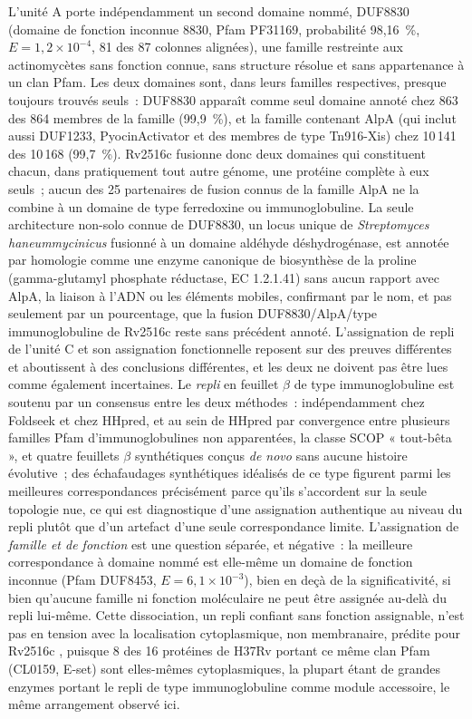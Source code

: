 \documentclass[11pt,a4paper]{article}
\begin{document}
L'unité A porte indépendamment un second domaine nommé, DUF8830 (domaine de fonction inconnue
8830, Pfam PF31169, probabilité 98,16~\%, $E=1,2\times10^{-4}$, 81 des 87 colonnes alignées), une
famille restreinte aux actinomycètes sans fonction connue, sans structure résolue et sans
appartenance à un clan Pfam. Les deux domaines sont, dans leurs familles respectives, presque
toujours trouvés seuls~: DUF8830 apparaît comme seul domaine annoté chez 863 des 864 membres de la
famille (99,9~\%), et la famille contenant AlpA (qui inclut aussi DUF1233, PyocinActivator et des
membres de type Tn916-Xis) chez 10\,141 des 10\,168 (99,7~\%). Rv2516c fusionne donc deux domaines
qui constituent chacun, dans pratiquement tout autre génome, une protéine complète à eux seuls~;
aucun des 25 partenaires de fusion connus de la famille AlpA ne la combine à un domaine de type
ferredoxine ou immunoglobuline. La seule architecture non-solo connue de DUF8830, un locus unique de
\textit{Streptomyces haneummycinicus} fusionné à un domaine aldéhyde déshydrogénase, est annotée par
homologie comme une enzyme canonique de biosynthèse de la proline (gamma-glutamyl phosphate
réductase, EC 1.2.1.41) sans aucun rapport avec AlpA, la liaison à l'ADN ou les éléments mobiles,
confirmant par le nom, et pas seulement par un pourcentage, que la fusion DUF8830/AlpA/type
immunoglobuline de Rv2516c reste sans précédent annoté. L'assignation de repli de l'unité C et son assignation
fonctionnelle reposent sur des preuves différentes et aboutissent à des conclusions différentes, et
les deux ne doivent pas être lues comme également incertaines. Le \emph{repli} en feuillet $\beta$
de type immunoglobuline est soutenu par un consensus entre les deux méthodes~: indépendamment chez
Foldseek et chez HHpred, et au sein de HHpred par convergence entre plusieurs familles Pfam
d'immunoglobulines non apparentées, la classe SCOP « tout-bêta », et quatre feuillets
$\beta$ synthétiques conçus \emph{de novo} sans aucune histoire évolutive~; des échafaudages
synthétiques idéalisés de ce type figurent parmi les meilleures correspondances précisément parce
qu'ils s'accordent sur la seule topologie nue, ce qui est diagnostique d'une assignation authentique
au niveau du repli plutôt que d'un artefact d'une seule correspondance limite. L'assignation de
\emph{famille et de fonction} est une question séparée, et négative~: la meilleure correspondance à
domaine nommé est elle-même un domaine de fonction inconnue (Pfam DUF8453, $E=6,1\times10^{-3}$),
bien en deçà de la significativité, si bien qu'aucune famille ni fonction moléculaire ne peut être
assignée au-delà du repli lui-même. Cette dissociation, un repli confiant sans fonction assignable,
n'est pas en tension avec la localisation cytoplasmique, non membranaire, prédite pour Rv2516c
\citep{hallgren2022deeptmhmm}, puisque 8 des 16 protéines de H37Rv portant ce même clan Pfam
(CL0159, E-set) sont elles-mêmes cytoplasmiques, la plupart étant de grandes enzymes portant le
repli de type immunoglobuline comme module accessoire, le même arrangement observé ici.
\end{document}

